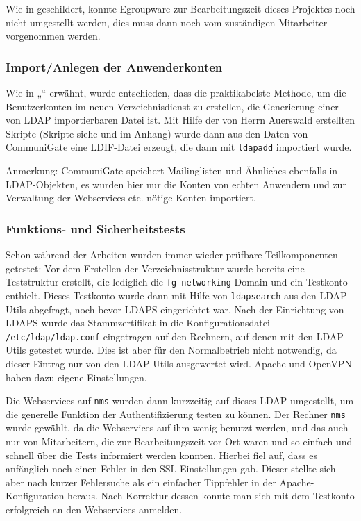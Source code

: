 \documentclass[11pt,a4paper,titlepage=firstiscover,headsepline,bibtotoc]{scrartcl} %
\begin{document}
Wie in  geschildert, konnte Egroupware zur Bearbeitungszeit dieses Projektes noch nicht umgestellt werden, dies muss dann noch vom zuständigen Mitarbeiter vorgenommen werden.

\subsubsection{Import/Anlegen der Anwenderkonten}
Wie in „“ erwähnt, wurde entschieden, dass die praktikabelste Methode, um die Benutzerkonten im neuen Verzeichnisdienst zu erstellen, die Generierung einer von LDAP importierbaren Datei ist. Mit Hilfe der von Herrn Auerswald erstellten Skripte (Skripte siehe  und  im Anhang) wurde dann aus den Daten von CommuniGate eine LDIF-Datei erzeugt, die dann mit \texttt{ldapadd} importiert wurde.

Anmerkung: CommuniGate speichert Mailinglisten und Ähnliches ebenfalls in LDAP-Objekten, es wurden hier nur die Konten von echten Anwendern und zur Verwaltung der Webservices etc. nötige Konten importiert.

\subsubsection{Funktions- und Sicherheitstests}
Schon während der Arbeiten wurden immer wieder prüfbare Teilkomponenten getestet: 
Vor dem Erstellen der Verzeichnisstruktur wurde bereits eine Teststruktur erstellt, die lediglich die \texttt{fg-networking}-Domain und ein Testkonto enthielt. Dieses Testkonto wurde dann mit Hilfe von \texttt{ldapsearch} aus den LDAP-Utils abgefragt, noch bevor LDAPS eingerichtet war. Nach der Einrichtung von LDAPS wurde das Stammzertifikat in die Konfigurationsdatei \texttt{/etc/ldap/ldap.conf} eingetragen auf den Rechnern, auf denen mit den LDAP-Utils getestet wurde. Dies ist aber für den Normalbetrieb nicht notwendig, da dieser Eintrag nur von den LDAP-Utils ausgewertet wird. Apache und OpenVPN haben dazu eigene Einstellungen.

Die Webservices auf \texttt{nms} wurden dann kurzzeitig auf dieses LDAP umgestellt, um die generelle Funktion der Authentifizierung testen zu können. Der Rechner \texttt{nms} wurde gewählt, da die Webservices auf ihm wenig benutzt werden, und das auch nur von Mitarbeitern, die zur Bearbeitungszeit vor Ort waren und so einfach und schnell über die Tests informiert werden konnten. Hierbei fiel auf, dass es anfänglich noch einen Fehler in den SSL-Einstellungen gab. Dieser stellte sich aber nach kurzer Fehlersuche als ein einfacher Tippfehler in der Apache-Konfiguration heraus. Nach Korrektur dessen konnte man sich mit dem Testkonto erfolgreich an den Webservices anmelden.
\end{document}
